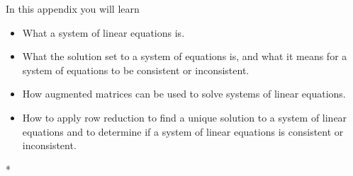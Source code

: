 \documentclass{workbook}
\begin{document}
\begin{bookonly}
\begin{appendix}\label{APPSLEI}

	In this appendix you will learn
	\begin{itemize}
		\item What a system of linear equations is.
		\item What the solution set to a system of equations is, and what it means for a system of equations
			to be consistent or inconsistent.
		\item How augmented matrices can be used to solve systems of linear equations.
		\item How to apply row reduction to find a unique solution to a system of linear
			equations and to determine if a system of linear equations is consistent or inconsistent.
	\end{itemize}

	
	
\end{appendix}


\begin{appendix}
	\PrintExerciseSolutions
\end{appendix}
	\begin{indices}*

		\printindex[symbols]

		\bigskip
		\printindex

		\bigskip
		\printindex[definitions]
	\end{indices}
\end{bookonly}
\end{document}
